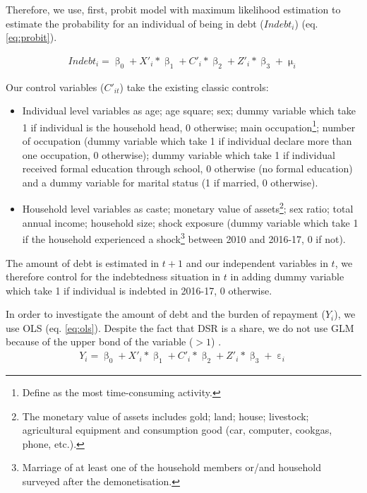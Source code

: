 \documentclass[a4paper, 11pt, onecolumn]{article}
\begin{document}
Therefore, we use, first, probit model with maximum likelihood estimation to estimate the probability for an individual of being in debt ($Indebt_{i}$) (eq. \ref{eq:probit}).

\begin{equation}\label{eq:probit}
\begin{split}
Indebt_{i}=\upbeta_{0}+X'_{i}*\upbeta_{1}+C'_{i}*\upbeta_{2}+Z'_{i}*\upbeta_{3}+\upmu_{i}
\end{split}
\end{equation}

Our control variables ($C'_{it}$) take the existing classic controls:
\begin{itemize}
\item Individual level variables as age; age square; sex; dummy variable which take 1 if individual is the household head, 0 otherwise; main occupation\footnote{Define as the most time-consuming activity.}; number of occupation (dummy variable which take 1 if individual declare more than one occupation, 0 otherwise); dummy variable which take 1 if individual received formal education through school, 0 otherwise (no formal education) and a dummy variable for marital status (1 if married, 0 otherwise). 
\item Household level variables as caste; monetary value of assets\footnote{The monetary value of assets includes gold; land; house; livestock; agricultural equipment and consumption good (car, computer, cookgas, phone, etc.).}; sex ratio; total annual income; household size; shock exposure (dummy variable which take 1 if the household experienced a shock\footnote{Marriage of at least one of the household members or/and household surveyed after the demonetisation.} between 2010 and 2016-17, 0 if not). 
\end{itemize}
The amount of debt is estimated in $t+1$ and our independent variables in $t$, we therefore control for the indebtedness situation in $t$ in adding dummy variable which take 1 if individual is indebted in 2016-17, 0 otherwise.

In order to investigate the amount of debt and the burden of repayment ($Y_{i}$), we use OLS (eq. \ref{eq:ols}).
Despite the fact that DSR is a share, we do not use GLM because of the upper bond of the variable ($>1$) \citep{Cook2008}.
\begin{equation}\label{eq:ols}
\begin{split}
Y_{i}=\upbeta_{0}+X'_{i}*\upbeta_{1}+C'_{i}*\upbeta_{2}+Z'_{i}*\upbeta_{3}+\upepsilon_i
\end{split}
\end{equation}
\end{document}
